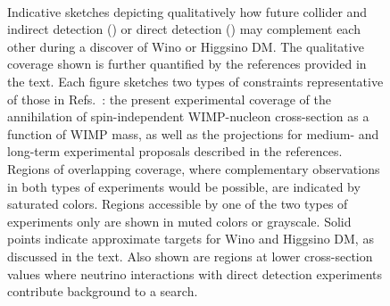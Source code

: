 \documentclass[nofootinbib]{article}
\begin{document}
\begin{figure}[htp]
\centering
{}\\

\caption{Indicative sketches depicting qualitatively how future collider and indirect detection (\protect{}) or direct detection (\protect{}) may complement each other during a discover of Wino or Higgsino DM. The qualitative coverage shown is further quantified by the references provided in the text. Each figure sketches two types of constraints representative of those in Refs.~\cite{Energy-Frontier-Report,Bose:2022obr,Boveia:2022jox,Strategy:2019vxc}: the present experimental coverage of the annihilation of spin-independent WIMP-nucleon cross-section as a function of WIMP mass, as well as the projections for medium- and long-term experimental proposals described in the references. Regions of overlapping coverage, where complementary observations in both types of experiments would be possible, are indicated by saturated colors. Regions accessible by one of the two types of experiments only are shown in muted colors or grayscale. Solid points indicate approximate targets for Wino and Higgsino DM, as discussed in the text. Also shown are regions at lower cross-section values where neutrino interactions with direct detection experiments contribute background to a search.}%
    \label{fig:WIMP}
\end{figure}
\end{document}
